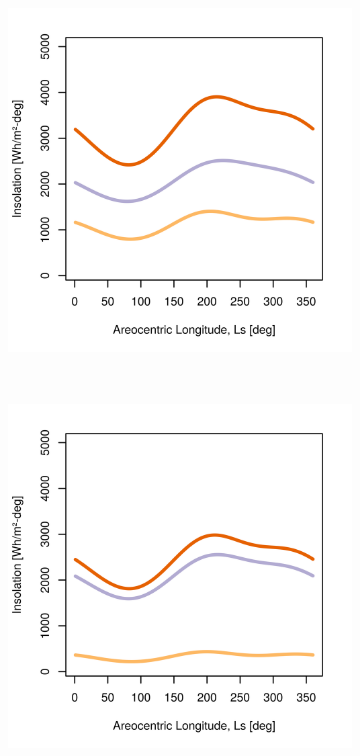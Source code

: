\begin{figure}[h]
\begin{subfigure}[t]{\subfigureWidth}
  		\includegraphics[height=\graphicsHeight]{sections/mars-solar-energy/solar-radiation/plots/hh-hbh-and-hdh-as-a-function-of-ls-for-tau1-phi205-and-albedo-027}
  		\label{fig:sub:insolation-ls-tau-factor-1}
  	\end{subfigure}\\[0.8ex]
    \begin{subfigure}[t]{\subfigureWidth}
      \centering
  		\includegraphics[height=\graphicsHeight]{sections/mars-solar-energy/solar-radiation/plots/hh-hbh-and-hdh-as-a-function-of-ls-for-tau2-phi205-and-albedo-027}

\end{subfigure}
\end{figure}
